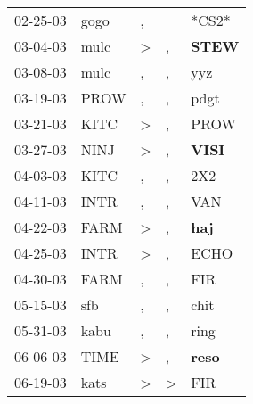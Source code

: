 \begin{supertabular}{p{0.07\textwidth}p{0.06\textwidth}p{0.02\textwidth}p{0.02\textwidth}p{0.06\textwidth}}
          02-25-03\textsuperscript{} &           gogo\textsuperscript{} &                , &               &                            *CS2* \\
          03-04-03\textsuperscript{} &           mulc\textsuperscript{} &     \textgreater &             , &  \textbf{STEW\textsuperscript{}} \\
          03-08-03\textsuperscript{} &           mulc\textsuperscript{} &                , &             , &            yyz\textsuperscript{} \\
          03-19-03\textsuperscript{} &           PROW\textsuperscript{} &                , &             , &           pdgt\textsuperscript{} \\
          03-21-03\textsuperscript{} &           KITC\textsuperscript{} &     \textgreater &             , &           PROW\textsuperscript{} \\
          03-27-03\textsuperscript{} &           NINJ\textsuperscript{} &     \textgreater &             , &  \textbf{VISI\textsuperscript{}} \\
          04-03-03\textsuperscript{} &           KITC\textsuperscript{} &                , &             , &            2X2\textsuperscript{} \\
          04-11-03\textsuperscript{} &           INTR\textsuperscript{} &                , &             , &            VAN\textsuperscript{} \\
          04-22-03\textsuperscript{} &           FARM\textsuperscript{} &     \textgreater &             , &   \textbf{haj\textsuperscript{}} \\
          04-25-03\textsuperscript{} &           INTR\textsuperscript{} &     \textgreater &             , &           ECHO\textsuperscript{} \\
          04-30-03\textsuperscript{} &           FARM\textsuperscript{} &                , &             , &            FIR\textsuperscript{} \\
          05-15-03\textsuperscript{} &            sfb\textsuperscript{} &                , &             , &           chit\textsuperscript{} \\
          05-31-03\textsuperscript{} &           kabu\textsuperscript{} &                , &             , &           ring\textsuperscript{} \\
          06-06-03\textsuperscript{} &           TIME\textsuperscript{} &     \textgreater &             , &  \textbf{reso\textsuperscript{}} \\
          06-19-03\textsuperscript{} &           kats\textsuperscript{} &     \textgreater &  \textgreater &            FIR\textsuperscript{} \\

\end{supertabular}
